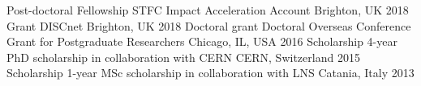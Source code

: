 
\begin{cvhonors}
  \cvhonor 
      {Post-doctoral Fellowship}
      {STFC Impact Acceleration Account}
      {Brighton, UK}
      {2018}
  \cvhonor 
      {Grant}
      {DISCnet}
      {Brighton, UK}
      {2018}
  \cvhonor
      {Doctoral grant}
      {Doctoral Overseas Conference Grant for Postgraduate Researchers}
      {Chicago, IL, USA}
      {2016}
  \cvhonor
      {Scholarship}
      {4-year PhD scholarship in collaboration with CERN}
      {CERN, Switzerland}
      {2015}
  \cvhonor
      {Scholarship}
      {1-year MSc scholarship in collaboration with LNS}
      {Catania, Italy}
      {2013}
\end{cvhonors}